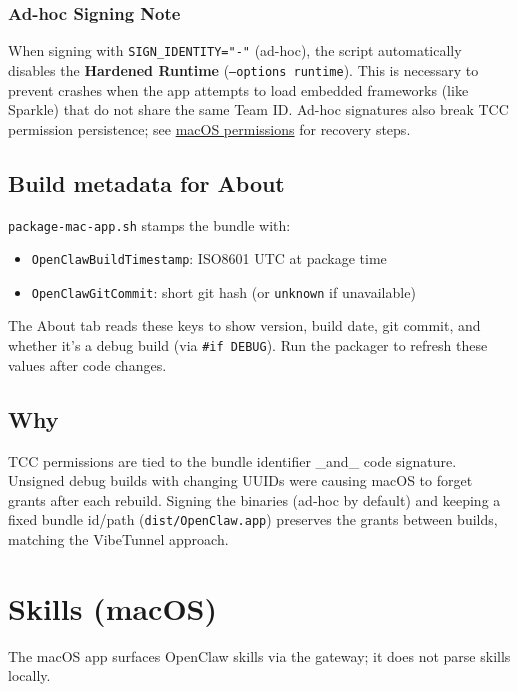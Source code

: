 \subsubsection{Ad-hoc Signing Note}


When signing with \texttt{SIGN\_IDENTITY="-"} (ad-hoc), the script automatically disables the \textbf{Hardened Runtime} (\texttt{--options runtime}). This is necessary to prevent crashes when the app attempts to load embedded frameworks (like Sparkle) that do not share the same Team ID. Ad-hoc signatures also break TCC permission persistence; see \href{/platforms/mac/permissions}{macOS permissions} for recovery steps.

\subsection{Build metadata for About}


\texttt{package-mac-app.sh} stamps the bundle with:

\begin{itemize}
  \item \texttt{OpenClawBuildTimestamp}: ISO8601 UTC at package time
  \item \texttt{OpenClawGitCommit}: short git hash (or \texttt{unknown} if unavailable)
\end{itemize}


The About tab reads these keys to show version, build date, git commit, and whether it’s a debug build (via \texttt{\#if DEBUG}). Run the packager to refresh these values after code changes.

\subsection{Why}


TCC permissions are tied to the bundle identifier \_and\_ code signature. Unsigned debug builds with changing UUIDs were causing macOS to forget grants after each rebuild. Signing the binaries (ad‑hoc by default) and keeping a fixed bundle id/path (\texttt{dist/OpenClaw.app}) preserves the grants between builds, matching the VibeTunnel approach.


\clearpage

\section{Skills (macOS)}


The macOS app surfaces OpenClaw skills via the gateway; it does not parse skills locally.

